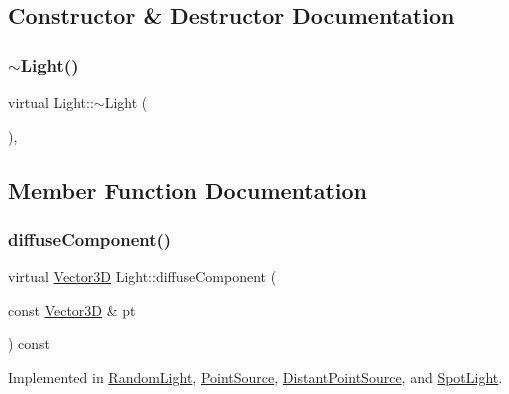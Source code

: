 \subsection{Constructor \& Destructor Documentation}
\mbox{\label{classLight_abe675054027c4b4a4f3e9a31d330931f}} 
\subsubsection{\texorpdfstring{$\sim$Light()}{~Light()}}
{\footnotesize\ttfamily virtual Light\+::$\sim$\+Light (\begin{DoxyParamCaption}{ }\end{DoxyParamCaption})\hspace{0.3cm}{\ttfamily [inline]}, {\ttfamily [virtual]}}



\subsection{Member Function Documentation}
\mbox{\label{classLight_af5dc859ada149ca54ec5088e1c33deb4}} 
\subsubsection{\texorpdfstring{diffuseComponent()}{diffuseComponent()}}
{\footnotesize\ttfamily virtual \mbox{\hyperlink{classVector3D}{Vector3D}} Light\+::diffuse\+Component (\begin{DoxyParamCaption}\item[{const \mbox{\hyperlink{classVector3D}{Vector3D}} \&}]{pt }\end{DoxyParamCaption}) const\hspace{0.3cm}{\ttfamily [pure virtual]}}



Implemented in \mbox{\hyperlink{classRandomLight_a371cbc5df30db46ac53cd0a9be91ac52}{Random\+Light}}, \mbox{\hyperlink{classPointSource_a445e9566d2226d1b8afd76274fb006fb}{Point\+Source}}, \mbox{\hyperlink{classDistantPointSource_ae3682ba2e553f38d6c9e4ee1bed9504f}{Distant\+Point\+Source}}, and \mbox{\hyperlink{classSpotLight_a0810e4bd136caddea0c65b819f2bd400}{Spot\+Light}}.

